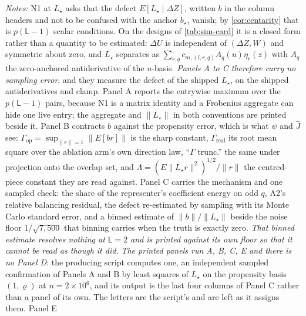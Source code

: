 \documentclass[
  12pt]{article}
\newcommand{\1}[1]{\mathds{1}\left[#1\right]}
\theoremstyle{plain}
\theoremstyle{definition}
\theoremstyle{definition}
\theoremstyle{remark}
\begin{document}
\begin{table}[!htbp]
\begin{threeparttable}
\begin{tablenotes}\scriptsize
\item \textit{Notes:} N1 at $L_\star$ asks that the defect
$E[L_\star\mid\Delta Z]$, written $b$ in the column headers and not to be
confused with the anchor $b_\star$, vanish; by \cref{cor:centarity} that is
$p(\mathsf L-1)$ scalar conditions. On
the designs of \cref{tab:sim-card} it is a closed form rather than a quantity to
be estimated: $\Delta U$ is independent of $(\Delta Z,W)$ and symmetric about
zero, and $L_\star$ separates as $\sum_{r,q}c_{m,(l,r,q)}A_q(u)\eta_r(z)$ with
$A_q$ the zero-anchored antiderivative of the $u$-basis. \emph{Panels A to C
therefore carry no sampling error}, and they measure the defect of the shipped
$L_\star$, on the shipped antiderivatives and clamp. Panel A reports the
entrywise maximum over the $p(\mathsf L-1)$ pairs, because N1 is a matrix
identity and a Frobenius aggregate can hide one live entry; the aggregate and
$\|L_\star\|$ in both conventions are printed beside it. Panel B contracts $b$
against the
propensity error, which is what $\psi$ and $\hat J$ see:
$\Gamma_{\mathrm{op}}=\sup_{\|r\|=1}\|E[br]\|$ is the sharp constant,
$\Gamma_{\mathrm{real}}$ its root mean square over the ablation arm's own
direction law, ``$\Gamma$ trunc.'' the same under projection onto the overlap
set, and $\Lambda=(E\|L_\star r\|^{2})^{1/2}/\|r\|$ the centred-piece constant
they are read against. Panel C carries the mechanism and one sampled check: the
share of the representer's coefficient energy on odd $q$, A2's relative balancing
residual, the defect re-estimated by sampling with its Monte Carlo standard
error, and a binned estimate of $\|b\|/\|L_\star\|$ beside the noise floor
$1/\sqrt{7{,}500}$ that binning carries when the truth is exactly zero.
\emph{That binned estimate resolves nothing at $\mathsf L=2$ and is printed
against its own floor so that it cannot be read as though it did.} \emph{The
printed panels run A, B, C, E and there is no Panel D}: the producing script
computes one, an independent sampled confirmation of Panels A and B by least
squares of $L_\star$ on the propensity basis $(1,\varrho)$ at $n=2\times10^{6}$,
and its output is the last four columns of Panel C rather than a panel of its
own. The letters are the script's and are left as it assigns them. Panel E

\end{tablenotes}
\end{threeparttable}
\end{table}
\end{document}
